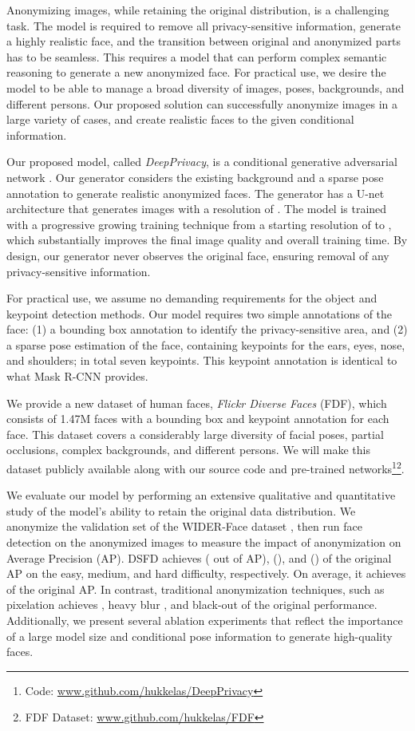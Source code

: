 \documentclass[runningheads]{llncs}
\begin{document}
Anonymizing images, while retaining the original distribution, is a challenging task. The model is required to remove all privacy-sensitive information, generate a highly realistic face, and the transition between original and anonymized parts has to be seamless. 
This requires a model that can perform complex semantic reasoning to generate  a new anonymized face.
For practical use, we desire the model to be able to manage a broad diversity of images, poses, backgrounds, and different persons. Our proposed solution can successfully anonymize images in a large variety of cases, and create realistic faces to the given conditional information. 

Our proposed model, called \textit{DeepPrivacy}, is a conditional generative adversarial  network \cite{Goodfellow2014,Mirza2014}. Our generator considers the existing background and a sparse pose annotation to generate realistic anonymized faces. 
The generator has a U-net architecture \cite{ronneberger2015u} that generates images with a resolution of . 
The model is trained with a progressive growing training technique \cite{Karras2017} from a starting resolution of  to , which substantially improves the final image quality and overall training time. 
By design, our generator never observes the original face, ensuring removal of any privacy-sensitive information.


For practical use, we assume no demanding requirements for the object and keypoint detection methods. Our model requires two simple annotations of the face: (1) a bounding box annotation to identify the privacy-sensitive area, and (2) a sparse pose estimation of the face, containing keypoints for the ears, eyes, nose, and shoulders; in total seven keypoints. This keypoint annotation is identical to what Mask R-CNN \cite{He2017} provides.

We provide a new dataset of human faces, \textit{Flickr Diverse Faces} (FDF), which consists of 1.47M faces with a bounding box and keypoint annotation for each face. This dataset covers a considerably large diversity of facial poses, partial occlusions, complex backgrounds, and different persons. We will make this dataset publicly available along with our source code and pre-trained networks\footnote{Code: \url{www.github.com/hukkelas/DeepPrivacy}}\footnote{FDF Dataset: \url{www.github.com/hukkelas/FDF}}.


We evaluate our model by performing an extensive qualitative and quantitative study of the model's  ability to retain the original data distribution. 
We anonymize the validation set of the WIDER-Face dataset \cite{yang2016wider}, then run face detection on the anonymized images to measure the impact of anonymization on Average Precision (AP). 
DSFD \cite{li2018dsfd} achieves  ( out of  AP),  (), and  () of the original AP on the easy, medium, and hard difficulty, respectively.
On average, it achieves  of the original AP.
In contrast, traditional anonymization techniques, such as  pixelation achieves , heavy blur , and black-out  of the original performance.
Additionally, we present several ablation experiments that reflect the importance of a large model size and conditional pose information to generate high-quality faces.
\end{document}
